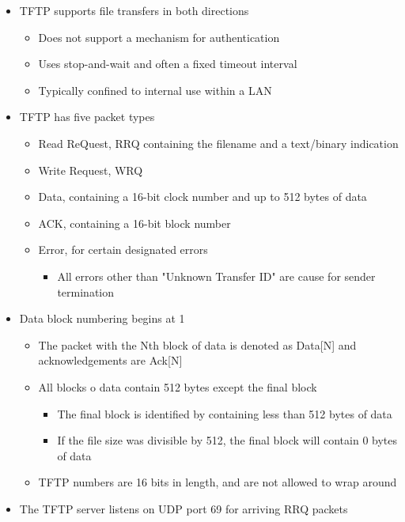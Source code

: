 \documentclass[11pt]{article}
\providecommand{\tightlist}{%
      \setlength{\itemsep}{0pt}\setlength{\parskip}{0pt}}
\begin{document}
\begin{itemize}
\tightlist
\item
  TFTP supports file transfers in both directions

  \begin{itemize}
  \tightlist
  \item
    Does not support a mechanism for authentication
  \item
    Uses stop-and-wait and often a fixed timeout interval
  \item
    Typically confined to internal use within a LAN
  \end{itemize}
\item
  TFTP has five packet types

  \begin{itemize}
  \tightlist
  \item
    Read ReQuest, RRQ containing the filename and a text/binary
    indication
  \item
    Write Request, WRQ
  \item
    Data, containing a 16-bit clock number and up to 512 bytes of data
  \item
    ACK, containing a 16-bit block number
  \item
    Error, for certain designated errors

    \begin{itemize}
    \tightlist
    \item
      All errors other than "Unknown Transfer ID" are cause for sender
      termination
    \end{itemize}
  \end{itemize}
\item
  Data block numbering begins at 1

  \begin{itemize}
  \tightlist
  \item
    The packet with the Nth block of data is denoted as Data{[}N{]} and
    acknowledgements are Ack{[}N{]}
  \item
    All blocks o data contain 512 bytes except the final block

    \begin{itemize}
    \tightlist
    \item
      The final block is identified by containing less than 512 bytes of
      data
    \item
      If the file size was divisible by 512, the final block will
      contain 0 bytes of data
    \end{itemize}
  \item
    TFTP numbers are 16 bits in length, and are not allowed to wrap
    around
  \end{itemize}
\item
  The TFTP server listens on UDP port 69 for arriving RRQ packets


\end{itemize}
\end{document}
